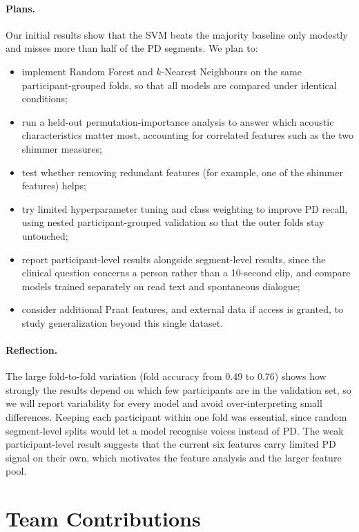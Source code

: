 \documentclass[11pt]{article}
\begin{document}
\paragraph{Plans.}
Our initial results show that the SVM beats the majority baseline only modestly and misses
more than half of the PD segments. We plan to:
\begin{itemize}
  \item implement Random Forest and $k$-Nearest Neighbours on the same participant-grouped
    folds, so that all models are compared under identical conditions;
  \item run a held-out permutation-importance analysis to answer which acoustic
    characteristics matter most, accounting for correlated features such as the two
    shimmer measures;
  \item test whether removing redundant features (for example, one of the shimmer
    features) helps;
  \item try limited hyperparameter tuning and class weighting to improve PD recall, using
    nested participant-grouped validation so that the outer folds stay untouched;
  \item report participant-level results alongside segment-level results, since the
    clinical question concerns a person rather than a 10-second clip, and compare models
    trained separately on read text and spontaneous dialogue;
  \item consider additional Praat features, and external data if access is granted, to
    study generalization beyond this single dataset.
\end{itemize}

\paragraph{Reflection.}
The large fold-to-fold variation (fold accuracy from 0.49 to 0.76) shows how strongly the
results depend on which few participants are in the validation set, so we will report
variability for every model and avoid over-interpreting small differences. Keeping each
participant within one fold was essential, since random segment-level splits would let a
model recognise voices instead of PD. The weak participant-level result suggests that the
current six features carry limited PD signal on their own, which motivates the feature
analysis and the larger feature pool.

\section*{Team Contributions}
\end{document}
